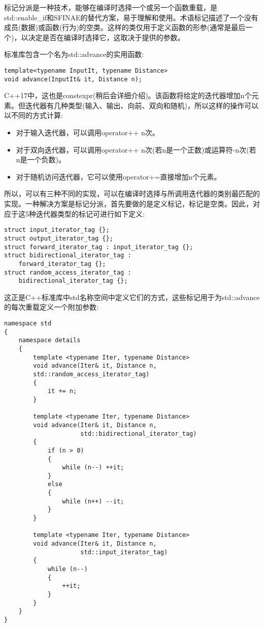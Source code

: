 
标记分派是一种技术，能够在编译时选择一个或另一个函数重载，是std::enable\_if和SFINAE的替代方案，易于理解和使用。术语标记描述了一个没有成员(数据)或函数(行为)的空类。这样的类仅用于定义函数的形参(通常是最后一个)，以决定是否在编译时选择它，这取决于提供的参数。

标准库包含一个名为std::advance的实用函数:

\begin{lstlisting}[style=styleCXX]
template<typename InputIt, typename Distance>
void advance(InputIt& it, Distance n);
\end{lstlisting}

C++17中，这也是constexpr(稍后会详细介绍)。该函数将给定的迭代器增加n个元素。但迭代器有几种类型(输入、输出、向前、双向和随机)，所以这样的操作可以以不同的方式计算:

\begin{itemize}
\item
对于输入迭代器，可以调用operator++ n次。

\item
对于双向迭代器，可以调用operator++ n次(若n是一个正数)或运算符-n次(若n是一个负数)。

\item
对于随机访问迭代器，它可以使用operator+=直接增加n个元素。
\end{itemize}

所以，可以有三种不同的实现，可以在编译时选择与所调用迭代器的类别最匹配的实现。一种解决方案是标记分派，首先要做的是定义标记，标记是空类。因此，对应于这5种迭代器类型的标记可进行如下定义:

\begin{lstlisting}[style=styleCXX]
struct input_iterator_tag {};
struct output_iterator_tag {};
struct forward_iterator_tag : input_iterator_tag {};
struct bidirectional_iterator_tag :
	forward_iterator_tag {};
struct random_access_iterator_tag :
	bidirectional_iterator_tag {};
\end{lstlisting}

这正是C++标准库中std名称空间中定义它们的方式，这些标记用于为std::advance的每次重载定义一个附加参数:

\begin{lstlisting}[style=styleCXX]
namespace std
{
	namespace details
	{
		template <typename Iter, typename Distance>
		void advance(Iter& it, Distance n,
		std::random_access_iterator_tag)
		{
			it += n;
		}
	
		template <typename Iter, typename Distance>
		void advance(Iter& it, Distance n,
					 std::bidirectional_iterator_tag)
		{
			if (n > 0)
			{
				while (n--) ++it;
			}
			else
			{
				while (n++) --it;
			}
		}

		template <typename Iter, typename Distance>
		void advance(Iter& it, Distance n,
				     std::input_iterator_tag)
		{
			while (n--)
			{
				++it;
			}
		}
	}
}
\end{lstlisting}

